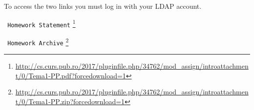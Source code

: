 To access the two links you must log in with your LDAP account.

\texttt{ Homework Statement} \footnote{\url{http://cs.curs.pub.ro/2017/pluginfile.php/34762/mod\_assign/introattachment/0/Tema1-PP.pdf?forcedownload=1}}

\texttt{ Homework Archive} \footnote{\url{http://cs.curs.pub.ro/2017/pluginfile.php/34762/mod\_assign/introattachment/0/Tema1-PP.zip?forcedownload=1}}